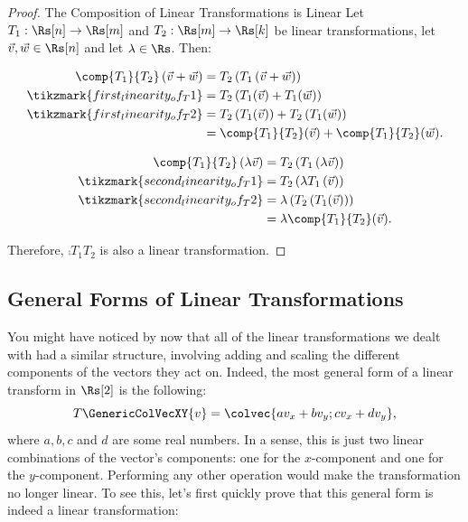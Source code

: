 \begin{proof}{The Composition of Linear Transformations is Linear}{}
	Let $T_{1}:\Rs[n]\to\Rs[m]$ and $T_{2}:\Rs[m]\to\Rs[k]$ be linear transformations, let $\vec{v},\vec{w}\in\Rs[n]$ and let $\lambda\in\Rs$. Then:
	\begin{descitemize}
		\item[Additivity]
		\begin{align*}
			\comp{T_{1}}{T_{2}}\left(\vec{v}+\vec{w}\right) & = T_{2}\left(T_{1}\left(\vec{v}+\vec{w}\right)\right)                 \\
			\tikzmark{first_linearity_of_T1}                & = T_{2}\left(T_{1}(\vec{v})+T_{1}(\vec{w})\right)                     \\
			\tikzmark{first_linearity_of_T2}                & = T_{2}\left(T_{1}(\vec{v})\right) + T_{2}\left(T_{1}(\vec{w})\right) \\
			                                                & = \comp{T_{1}}{T_{2}}(\vec{v}) + \comp{T_{1}}{T_{2}}(\vec{w}).
		\end{align*}

		\item[Homogeneity]
		\begin{align*}
			\comp{T_{1}}{T_{2}}\left(\lambda\vec{v}\right) & = T_{2}\left(T_{1}\left(\lambda\vec{v}\right)\right)   \\
			\tikzmark{second_linearity_of_T1}              & = T_{2}\left(\lambda T_{1}\left(\vec{v}\right)\right)  \\
			\tikzmark{second_linearity_of_T2}              & = \lambda\left(T_{2}\left(T_{1}(\vec{v})\right)\right) \\
			                                               & = \lambda\comp{T_{1}}{T_{2}}(\vec{v}).
		\end{align*}
	\end{descitemize}

	Therefore, $\comp{T_{1}}{T_{2}}$ is also a linear transformation.
\end{proof}

\subsection{General Forms of Linear Transformations}
You might have noticed by now that all of the linear transformations we dealt with had a similar structure, involving adding and scaling the different components of the vectors they act on. Indeed, the most general form of a linear transform in $\Rs[2]$ is the following:
\begin{equation}
	T\GenericColVecXY{v} = \colvec{av_{x}+bv_{y};cv_{x}+dv_{y}},
	\label{eq:general LT in R2}
\end{equation}
where $a,b,c$ and $d$ are some real numbers. In a sense, this is just two linear combinations of the vector's components: one for the $x$-component and one for the $y$-component. Performing any other operation would make the transformation no longer linear. To see this, let's first quickly prove that this general form is indeed a linear transformation:

